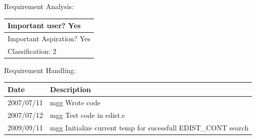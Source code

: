 Requirement Analysis:

\begin{tabular}{|p{433pt}|} \hline
Important user? Yes \\ \hline
Important Aspiration? Yes \\ \hline
Classification: 2 \\ \hline
\end{tabular}
\vspace{24pt}

Requirement Handling:

\begin{tabular}{|p{72pt}|p{351pt}|} \hline
Date & Description \\ \hline
2007/07/11 & mgg Wrote code \\ \hline
2007/07/12 & mgg Test code in edist.c \\ \hline
2009/09/11 & mgg Initialize current temp for sucessfull EDIST\_CONT
search \\ \hline
\end{tabular}

